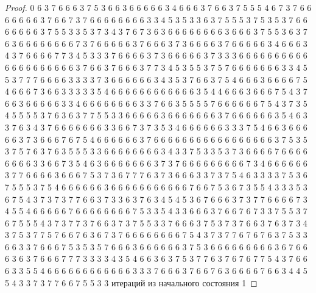 \begin{proof}
	0 6 3 7 6 6 6 3 7 5 3 6 6 3 6 6 6 6 6 3 4 6 6 6 3 7 6 6 3 7 5 5 5 4 6 7 3 7 6 6 6 6 6 6 6 3 7 6 6 7 3 7 6 6 6 6 6 6 6 6 3 3 4 5 3 5 3 3 6 3 7 5 5 5 3 7 5 3 5 3 7 6 6 6 6 6 6 6 3 7 5 5 3 3 5 3 7 3 4 3 7 6 7 3 6 3 6 6 6 6 6 6 6 6 3 6 6 6 3 7 5 5 3 6 3 7 6 3 6 6 6 6 6 6 6 6 7 3 7 6 6 6 6 6 3 7 6 6 6 3 7 3 6 6 6 6 3 7 6 6 6 6 6 3 4 6 6 6 3 4 3 7 6 6 6 6 7 7 3 4 5 3 3 3 7 6 6 6 6 3 7 3 6 6 6 6 6 3 7 3 3 3 6 6 6 6 6 6 6 6 6 6 6 6 6 6 6 6 6 6 6 6 3 7 6 6 3 7 6 6 6 3 7 7 3 4 5 3 5 5 3 7 5 7 6 6 6 6 6 6 6 3 3 4 5 5 3 7 7 7 6 6 6 6 3 3 3 3 7 3 6 6 6 6 6 6 3 4 3 5 3 7 6 6 3 7 5 4 6 6 6 3 6 6 6 6 7 5 4 6 6 6 7 3 6 6 3 3 3 3 3 5 4 6 6 6 6 6 6 6 6 6 6 6 6 3 5 4 4 6 6 6 3 6 6 6 7 5 4 3 7 6 6 3 6 6 6 6 6 3 3 4 6 6 6 6 6 6 6 6 3 3 7 6 6 3 5 5 5 5 7 6 6 6 6 6 6 7 5 4 3 7 3 5 4 5 5 5 5 3 7 6 3 6 3 7 7 5 5 3 3 6 6 6 6 6 3 6 6 6 6 6 6 6 3 7 6 6 6 6 6 6 3 5 4 6 3 3 7 6 3 4 3 7 6 6 6 6 6 6 6 3 3 6 6 7 3 7 3 5 3 4 6 6 6 6 6 6 3 3 3 7 5 4 6 6 3 6 6 6 6 6 3 7 3 6 6 6 7 6 7 5 4 6 6 6 6 6 6 3 7 6 6 6 6 6 6 6 6 6 6 6 6 6 6 6 6 6 3 7 5 3 5 3 7 5 7 6 3 7 6 3 5 5 5 3 3 6 6 6 6 6 6 6 6 3 4 3 3 7 5 3 3 5 3 7 3 6 6 6 6 7 6 6 6 6 6 6 6 6 3 3 6 6 7 3 5 4 6 3 6 6 6 6 6 6 6 3 7 3 7 6 6 6 6 6 6 6 6 6 7 3 4 6 6 6 6 6 6 3 7 7 6 6 6 6 3 6 6 6 7 5 3 7 3 6 7 7 7 6 3 7 3 6 6 6 3 3 7 3 7 5 4 6 3 3 3 3 7 5 3 6 7 5 5 5 3 7 5 4 6 6 6 6 6 6 3 6 6 6 6 6 6 6 6 6 6 6 7 6 6 7 5 3 6 7 3 5 5 4 3 3 3 5 3 6 7 5 4 3 7 3 7 3 7 7 6 6 3 7 3 3 6 3 7 6 3 4 5 4 5 3 6 7 6 6 6 3 7 3 7 7 6 6 6 6 7 3 4 5 5 4 6 6 6 6 6 7 6 6 6 6 6 6 6 6 7 5 3 3 5 4 3 3 6 6 6 3 7 6 6 7 6 7 3 3 7 5 5 3 7 6 7 5 5 5 4 3 7 3 7 7 3 7 6 6 3 7 3 7 5 5 3 3 7 6 6 6 3 7 5 3 7 3 7 6 6 3 7 6 3 7 3 4 3 7 5 3 7 7 5 7 6 6 7 6 3 6 7 3 7 6 6 6 6 6 6 6 6 7 5 4 3 7 3 7 7 6 7 6 7 6 3 7 5 3 3 6 6 3 3 7 6 6 6 7 5 3 5 3 5 7 6 6 6 3 6 6 6 6 6 6 3 7 5 3 6 6 6 6 6 6 6 6 6 3 6 7 6 6 6 3 6 3 7 6 6 6 7 7 7 3 3 3 3 4 3 5 4 6 6 3 6 3 7 5 3 7 7 6 3 7 6 7 6 7 7 5 4 3 7 6 6 6 3 3 5 5 4 6 6 6 6 6 6 6 6 6 6 6 6 3 3 3 7 6 6 6 3 7 6 6 7 6 3 6 6 6 6 7 6 6 3 4 4 5 5 4 3 3 7 3 7 7 6 6 7 5 5 3 3 
	\newline
	 итераций из начального состояния 1
	\newline

\end{proof}
